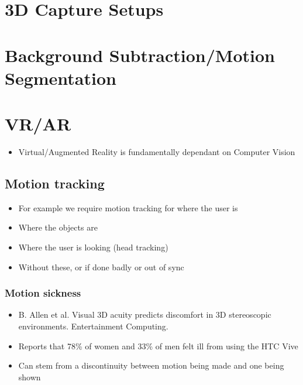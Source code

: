 \documentclass[a4paper]{article}
\begin{document}
\section{3D Capture Setups}
\label{sec-6}

\section{Background Subtraction/Motion Segmentation}
\label{sec-7}


\section{VR/AR}
\label{sec-8}
\begin{itemize}
\item Virtual/Augmented Reality is fundamentally dependant on Computer Vision
\end{itemize}
\subsection{Motion tracking}
\label{sec-8-1}
\begin{itemize}
\item For example we require motion tracking for where the user is
\item Where the objects are
\item Where the user is looking (head tracking)
\item Without these, or if done badly or out of sync
\end{itemize}
\subsubsection{Motion sickness}
\label{sec-8-1-1}
\begin{itemize}
\item B. Allen et al. Visual 3D acuity predicts discomfort in 3D stereoscopic environments. Entertainment Computing.
\item Reports that 78\% of women and 33\% of men felt ill from using the HTC Vive
\item Can stem from a discontinuity between motion being made and one being shown
\end{itemize}
\end{document}
